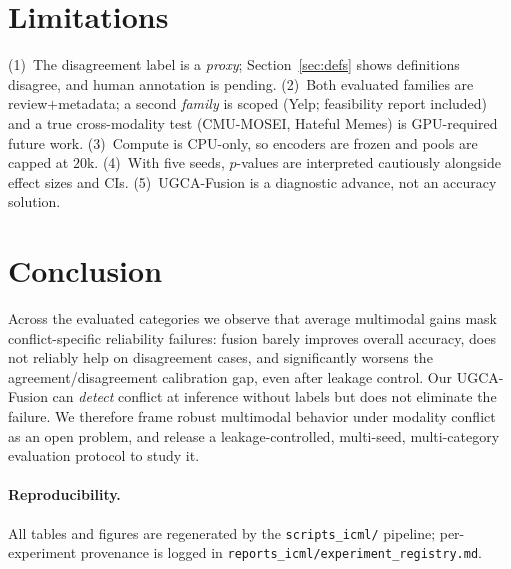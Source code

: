 \documentclass[11pt]{article}
\begin{document}
\section{Limitations}\label{sec:limits}
(1)~The disagreement label is a \emph{proxy}; Section~\ref{sec:defs} shows
definitions disagree, and human annotation is pending. (2)~Both evaluated
families are review${+}$metadata; a second \emph{family} is scoped (Yelp;
feasibility report included) and a true cross-modality test (CMU-MOSEI, Hateful
Memes) is GPU-required future work. (3)~Compute is CPU-only, so encoders are
frozen and pools are capped at $20$k. (4)~With five seeds, $p$-values are
interpreted cautiously alongside effect sizes and CIs. (5)~UGCA-Fusion is a
diagnostic advance, not an accuracy solution.

\section{Conclusion}
Across the evaluated categories we observe that average multimodal gains mask
conflict-specific reliability failures: fusion barely improves overall accuracy,
does not reliably help on disagreement cases, and significantly worsens the
agreement/disagreement calibration gap, even after leakage control. Our
UGCA-Fusion can \emph{detect} conflict at inference without labels but does not
eliminate the failure. We therefore frame robust multimodal behavior under
modality conflict as an open problem, and release a leakage-controlled,
multi-seed, multi-category evaluation protocol to study it.

\paragraph{Reproducibility.} All tables and figures are regenerated by the
\texttt{scripts\_icml/} pipeline; per-experiment provenance is logged in
\texttt{reports\_icml/experiment\_registry.md}.



\end{document}
